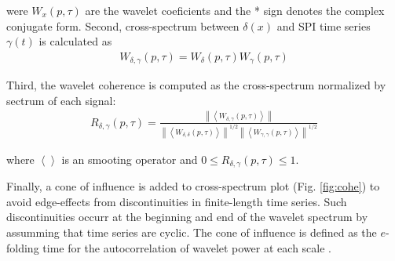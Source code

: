\documentclass[review,authoryear]{elsarticle}
\begin{document}
were $W_{x}(p,\tau)$ are the wavelet coeficients and the * sign
denotes the complex conjugate form. Second, cross-spectrum between
$\delta(x)$ and \gls{SPI} time series $\gamma(t)$ is calculated as
\begin{align}
W_{\delta,\gamma}(p,\tau)=W_{\delta}(p,\tau)W_{\gamma}(p,\tau)
\end{align}

Third, the wavelet coherence is computed as the cross-spectrum
normalized by sectrum of each signal:
\begin{align}
R_{\delta, \gamma}(p,\tau)=\frac{\left \| \left \langle W_{\delta,\gamma}(p,\tau) \right \rangle \right \|}{\left \| \left \langle W_{\delta,\delta}(p,\tau) \right \rangle \right \|^{1/2}\left \| \left \langle W_{\gamma,\gamma}(p,\tau) \right \rangle \right \|^{1/2}}
\end{align}

where $\left \langle \right \rangle$ is an smooting operator and
$0 \le R_{\delta, \gamma}(p,\tau) \le 1$.

Finally, a cone of influence is added to cross-spectrum plot
(Fig. \ref{fig:cohe}) to avoid edge-effects from discontinuities in
finite-length time series. Such discontinuities occurr at the
beginning and end of the wavelet spectrum by assumming that time
series are cyclic. The cone of influence is defined as the $e$-folding
time for the autocorrelation of wavelet power at each scale
\citep{Torrence1998}.



\end{document}
